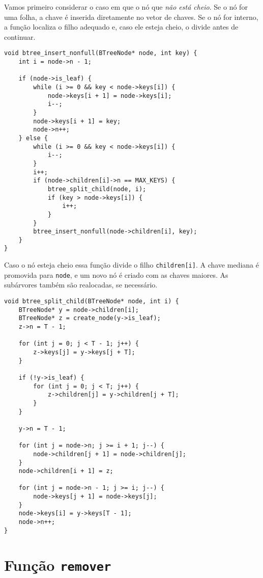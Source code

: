 Vamos primeiro considerar o caso em que o nó que \emph{não está cheio}. 
Se o nó for uma folha, a chave é inserida diretamente no vetor de chaves. 
Se o nó for interno, a função localiza o filho adequado e, caso ele esteja cheio, o divide antes de continuar.

\begin{lstlisting}
void btree_insert_nonfull(BTreeNode* node, int key) {
    int i = node->n - 1;

    if (node->is_leaf) {
        while (i >= 0 && key < node->keys[i]) {
            node->keys[i + 1] = node->keys[i];
            i--;
        }
        node->keys[i + 1] = key;
        node->n++;
    } else {
        while (i >= 0 && key < node->keys[i]) {
            i--;
        }
        i++;
        if (node->children[i]->n == MAX_KEYS) {
            btree_split_child(node, i);
            if (key > node->keys[i]) {
                i++;
            }
        }
        btree_insert_nonfull(node->children[i], key);
    }
}
\end{lstlisting}

Caso o nó esteja cheio essa função divide o filho \texttt{children[i]}. 
A chave mediana é promovida para \texttt{node}, e um novo nó é criado com as chaves maiores. 
As subárvores também são realocadas, se necessário.

\begin{lstlisting}
void btree_split_child(BTreeNode* node, int i) {
    BTreeNode* y = node->children[i];
    BTreeNode* z = create_node(y->is_leaf);
    z->n = T - 1;

    for (int j = 0; j < T - 1; j++) {
        z->keys[j] = y->keys[j + T];
    }

    if (!y->is_leaf) {
        for (int j = 0; j < T; j++) {
            z->children[j] = y->children[j + T];
        }
    }

    y->n = T - 1;

    for (int j = node->n; j >= i + 1; j--) {
        node->children[j + 1] = node->children[j];
    }
    node->children[i + 1] = z;

    for (int j = node->n - 1; j >= i; j--) {
        node->keys[j + 1] = node->keys[j];
    }
    node->keys[i] = y->keys[T - 1];
    node->n++;
}
\end{lstlisting}

\section{Função {\tt remover}}

